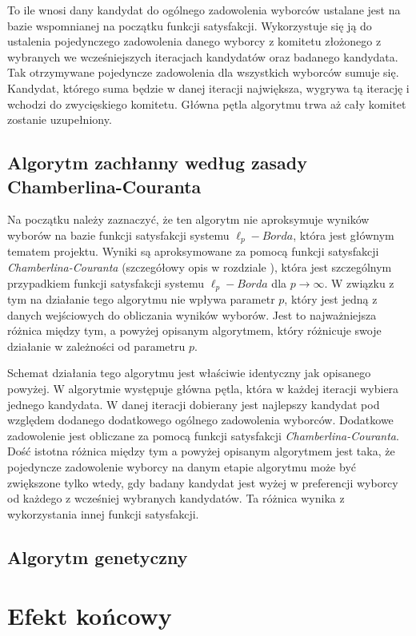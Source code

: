 \documentclass[polish,11pt]{aghthesis}
\begin{document}
To ile wnosi dany kandydat do ogólnego zadowolenia wyborców ustalane jest na bazie
wspomnianej na początku funkcji satysfakcji. Wykorzystuje się ją do ustalenia pojedynczego zadowolenia danego wyborcy z komitetu złożonego z wybranych we wcześniejszych
iteracjach kandydatów oraz badanego kandydata. Tak otrzymywane pojedyncze
zadowolenia dla wszystkich wyborców sumuje się. Kandydat, którego suma będzie w danej
iteracji największa, wygrywa tą iterację i wchodzi do zwycięskiego komitetu. Główna pętla
algorytmu trwa aż cały komitet zostanie uzupełniony.

\subsection{Algorytm zachłanny według zasady Chamberlina-Couranta}
Na początku należy zaznaczyć, że ten algorytm nie aproksymuje wyników wyborów na bazie
funkcji satysfakcji systemu $\ell_p-Borda$, która jest głównym tematem projektu. Wyniki są
aproksymowane za pomocą funkcji satysfakcji \textit{Chamberlina-Couranta} (szczegółowy opis w
rozdziale \textit{}), która jest szczególnym przypadkiem funkcji satysfakcji systemu $\ell_p-Borda$ dla $p \to \infty$. W związku z tym na działanie tego algorytmu nie wpływa parametr $p$, który jest jedną z danych wejściowych do obliczania wyników wyborów. Jest to najważniejsza różnica między tym, a powyżej opisanym algorytmem, który różnicuje swoje działanie w zależności od parametru $p$.

Schemat działania tego algorytmu jest właściwie identyczny jak opisanego powyżej. W algorytmie
występuje główna pętla, która w każdej iteracji wybiera jednego kandydata. W danej iteracji
dobierany jest najlepszy kandydat pod względem dodanego dodatkowego ogólnego
zadowolenia wyborców. Dodatkowe zadowolenie jest obliczane za pomocą funkcji satysfakcji \textit{Chamberlina-Couranta}. Dość istotna różnica między tym a powyżej opisanym algorytmem jest
taka, że pojedyncze zadowolenie wyborcy na danym etapie algorytmu może być zwiększone
tylko wtedy, gdy badany kandydat jest wyżej w preferencji wyborcy od każdego z wcześniej
wybranych kandydatów. Ta różnica wynika z wykorzystania innej funkcji satysfakcji.

\subsection{Algorytm genetyczny}

\section{Efekt końcowy}
\end{document}
